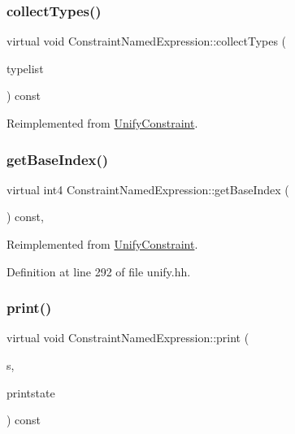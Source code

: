 \subsubsection{\texorpdfstring{collectTypes()}{collectTypes()}}
{\footnotesize\ttfamily virtual void Constraint\+Named\+Expression\+::collect\+Types (\begin{DoxyParamCaption}\item[{vector$<$ \mbox{\hyperlink{class_unify_datatype}{Unify\+Datatype}} $>$ \&}]{typelist }\end{DoxyParamCaption}) const\hspace{0.3cm}{\ttfamily [virtual]}}



Reimplemented from \mbox{\hyperlink{class_unify_constraint_acb83b6bea3b21e13054e72ac9cfaba0f}{Unify\+Constraint}}.

\mbox{\label{class_constraint_named_expression_a76051a70f5e66c4182d97b7e5333763d}} 
\subsubsection{\texorpdfstring{getBaseIndex()}{getBaseIndex()}}
{\footnotesize\ttfamily virtual int4 Constraint\+Named\+Expression\+::get\+Base\+Index (\begin{DoxyParamCaption}\item[{void}]{ }\end{DoxyParamCaption}) const\hspace{0.3cm}{\ttfamily [inline]}, {\ttfamily [virtual]}}



Reimplemented from \mbox{\hyperlink{class_unify_constraint_a44f0164f38ac1fdc44fc73ebe7678de1}{Unify\+Constraint}}.



Definition at line 292 of file unify.\+hh.

\mbox{\label{class_constraint_named_expression_ae977efc05b794d8c772c1f4c494a4d3b}} 
\subsubsection{\texorpdfstring{print()}{print()}}
{\footnotesize\ttfamily virtual void Constraint\+Named\+Expression\+::print (\begin{DoxyParamCaption}\item[{ostream \&}]{s,  }\item[{\mbox{\hyperlink{class_unify_c_printer}{Unify\+C\+Printer}} \&}]{printstate }\end{DoxyParamCaption}) const\hspace{0.3cm}{\ttfamily [virtual]}}



